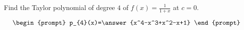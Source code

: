\documentclass{ximera}
\author{Gregory Hartman \and Matthew Carr}
\begin{document}
\begin{exercise}




Find the Taylor polynomial of degree $4$ of $f(x)=\frac{1}{1+x}$ at $c=0$.

\[
\begin{prompt}
p_{4}(x)=\answer{x^4-x^3+x^2-x+1}
\end{prompt}
\]

\end{exercise}
\end{document}
